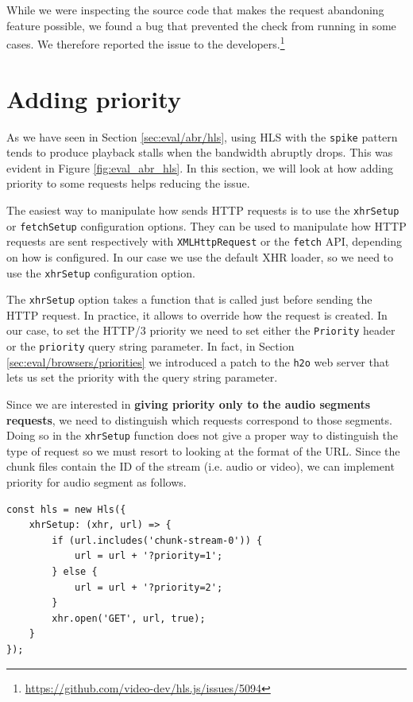 While we were inspecting the source code that makes the request abandoning feature possible, we found a bug that prevented the check from running in some cases. We therefore reported the issue to the \hlsjs{} developers.\footnote{\url{https://github.com/video-dev/hls.js/issues/5094}}

\section{Adding priority}
\label{sec:improvements/priority}

As we have seen in Section \ref{sec:eval/abr/hls}, using HLS with the \texttt{spike} pattern tends to produce playback stalls when the bandwidth abruptly drops. This was evident in Figure \ref{fig:eval_abr_hls}. In this section, we will look at how adding priority to some requests helps reducing the issue.

The easiest way to manipulate how \hlsjs{} sends HTTP requests is to use the \texttt{xhrSetup} or \texttt{fetchSetup} configuration options. They can be used to manipulate how HTTP requests are sent respectively with \texttt{XMLHttpRequest} or the \texttt{fetch} API, depending on how \hlsjs{} is configured. In our case we use the default XHR loader, so we need to use the \texttt{xhrSetup} configuration option.

The \texttt{xhrSetup} option takes a function that is called just before sending the HTTP request. In practice, it allows to override how the request is created. In our case, to set the HTTP/3 priority we need to set either the \texttt{Priority} header or the \texttt{priority} query string parameter. In fact, in Section \ref{sec:eval/browsers/priorities} we introduced a patch to the \texttt{h2o} web server that lets us set the priority with the query string parameter.

Since we are interested in \textbf{giving priority only to the audio segments requests}, we need to distinguish which requests correspond to those segments. Doing so in the \texttt{xhrSetup} function does not give a proper way to distinguish the type of request so we must resort to looking at the format of the URL. Since the chunk files contain the ID of the stream (i.e. audio or video), we can implement priority for audio segment as follows.

\begin{verbatim}
const hls = new Hls({
    xhrSetup: (xhr, url) => {
        if (url.includes('chunk-stream-0')) {
            url = url + '?priority=1';
        } else {
            url = url + '?priority=2';
        }
        xhr.open('GET', url, true);
    }
});
\end{verbatim}

